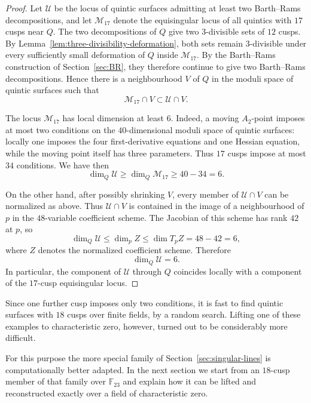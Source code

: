 \documentclass[10pt,a4paper]{article}
\begin{document}
\begin{proof}
Let $\mathcal U$ be the locus of quintic surfaces admitting at least two
Barth--Rams decompositions, and let $\mathcal M_{17}$ denote the equisingular
locus of all quintics with $17$ cusps near $Q$.  The two decompositions of $Q$
give two $3$-divisible sets of $12$ cusps.  By
Lemma~\ref{lem:three-divisibility-deformation}, both sets remain
$3$-divisible under every sufficiently small deformation of $Q$ inside
$\mathcal M_{17}$.  By the Barth--Rams construction of
Section~\ref{sec:BR}, they therefore continue to give two Barth--Rams
decompositions.  Hence there is a neighbourhood $V$ of $Q$ in the
moduli space of quintic surfaces such that
\[
        \mathcal M_{17}\cap V\subset \mathcal U\cap V.
\]

The locus $\mathcal M_{17}$ has local dimension at least $6$.  Indeed, a
moving $A_2$-point imposes at most two conditions on the $40$-dimensional
moduli space of quintic surfaces: locally one imposes the four first-derivative
equations and one Hessian equation, while the moving point itself has three
parameters.  Thus $17$ cusps impose at most $34$ conditions. We have then
\[
        \dim_Q\mathcal U\ge \dim_Q\mathcal M_{17}\ge 40-34=6.
\]

On the other hand, after possibly shrinking $V$, every member of
$\mathcal U\cap V$ can be normalized as above.  Thus $\mathcal U\cap V$ is
contained in the image of a neighbourhood of $p$ in the $48$-variable
coefficient scheme.  The Jacobian of this scheme has rank $42$ at $p$, so
\[
        \dim_Q\mathcal U
        \le \dim_p Z
        \le \dim T_pZ
        =48-42=6,
\]
where $Z$ denotes the normalized coefficient scheme.
Therefore
\[
        \dim_Q\mathcal U=6.
\]
In particular, the component of $\mathcal U$ through $Q$ coincides locally
with a component of the $17$-cusp equisingular locus.
\end{proof}

Since one further cusp imposes only two conditions, it is fast to find
quintic surfaces with $18$ cusps over finite fields, by a random search.
Lifting one of these examples to characteristic
zero, however, turned out to be considerably more difficult.

For this purpose the more special family of
Section~\ref{sec:singular-lines} is computationally better adapted.  In the
next section we start from an $18$-cusp member of that family over
$\mathbb F_{23}$ and explain how it can be lifted and reconstructed exactly
over a field of characteristic zero.
\end{document}
